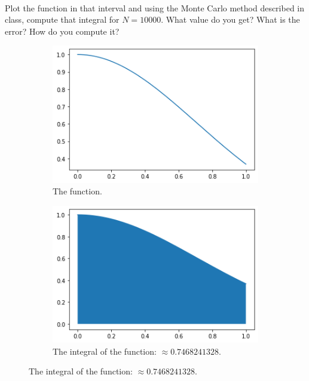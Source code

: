 \documentclass{article}
\begin{document}
\paragraph{}Plot the function in that interval and using the Monte Carlo method described in class, compute that integral for $N = 10000$. What value do you get? What is the error? How do you compute it?
\begin{figure}[h!]
	\centering
	\begin{subfigure}[b]{0.5\linewidth}
		\includegraphics[width=\linewidth]{fn.png}
		\caption{The function.}
	\end{subfigure}
	\newline
	\begin{subfigure}[b]{0.45\linewidth}
		\includegraphics[width=\linewidth]{fn_area.png}
		\caption{The integral of the function: $\approx 0.7468241328$.}
	\end{subfigure}

\end{figure}
\end{document}
